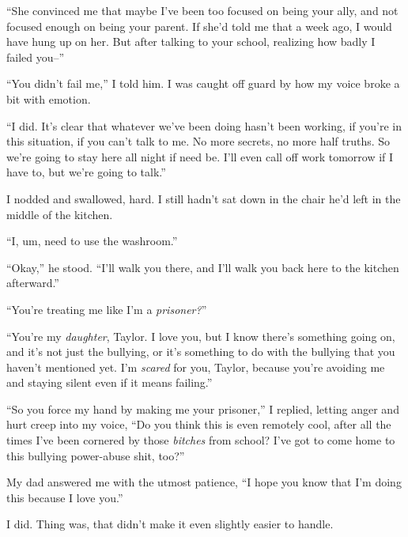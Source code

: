 ``She convinced me that maybe I've been too focused on being your ally, and not focused enough on being your parent.  If she'd told me that a week ago, I would have hung up on her.  But after talking to your school, realizing how badly I failed you--''



``You didn't fail me,'' I told him.  I was caught off guard by how my voice broke a bit with emotion.



``I did.  It's clear that whatever we've been doing hasn't been working, if you're in this situation, if you can't talk to me.  No more secrets, no more half truths.  So we're going to stay here all night if need be.  I'll even call off work tomorrow if I have to, but we're going to talk.''



I nodded and swallowed, hard.  I still hadn't sat down in the chair he'd left in the middle of the kitchen.



``I, um, need to use the washroom.''



``Okay,'' he stood.  ``I'll walk you there, and I'll walk you back here to the kitchen afterward.''



``You're treating me like I'm a\emph{ prisoner?}''



``You're my \emph{daughter}, Taylor.  I love you, but I know there's something going on, and it's not just the bullying, or it's something to do with the bullying that you haven't mentioned yet.  I'm \emph{scared} for you, Taylor, because you're avoiding me and staying silent even if it means failing.''



``So you force my hand by making me your prisoner,'' I replied, letting anger and hurt creep into my voice, ``Do you think this is even remotely cool, after all the times I've been cornered by those \emph{bitches} from school?  I've got to come home to this bullying power-abuse shit, too?''



My dad answered me with the utmost patience, ``I hope you know that I'm doing this because I love you.''



I did.  Thing was, that didn't make it even slightly easier to handle.



